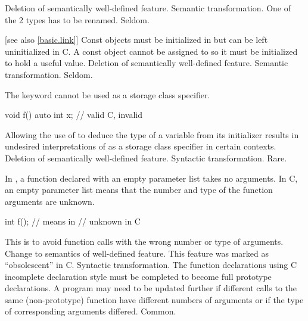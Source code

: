 \effect
Deletion of semantically well-defined feature.
\difficulty
Semantic transformation.
One of the 2 types has to be renamed.
\howwide
Seldom.

 [see also \ref{basic.link}]
\change
Const objects must be initialized in \Cpp{} but can be left uninitialized in C.
\rationale
A const object cannot be assigned to so it must be initialized
to hold a useful value.
\effect
Deletion of semantically well-defined feature.
\difficulty
Semantic transformation.
\howwide
Seldom.

\change
The keyword  cannot be used as a storage class specifier.

\begin{example}
\begin{codeblock}
void f() {
  auto int x;       // valid C, invalid \Cpp{}
}
\end{codeblock}
\end{example}

\rationale
Allowing the use of  to deduce the type
of a variable from its initializer results in undesired interpretations of
 as a storage class specifier in certain contexts.
\effect
Deletion of semantically well-defined feature.
\difficulty
Syntactic transformation.
\howwide
Rare.

\change
In \Cpp{}, a function declared with an empty parameter list takes no arguments.
In C, an empty parameter list means that the number and type of the function arguments are unknown.

\begin{example}
\begin{codeblock}
int f();            // means    in \Cpp{}
                    //  unknown \tcode{)} in C
\end{codeblock}
\end{example}

\rationale
This is to avoid function calls
with the wrong number or type of arguments.
\effect
Change to semantics of well-defined feature.
This feature was marked as ``obsolescent'' in C.
\difficulty
Syntactic transformation.
The function declarations using C incomplete declaration style must
be completed to become full prototype declarations.
A program may need to be updated further if different calls to the
same (non-prototype) function have different numbers of arguments or
if the type of corresponding arguments differed.
\howwide
Common.

